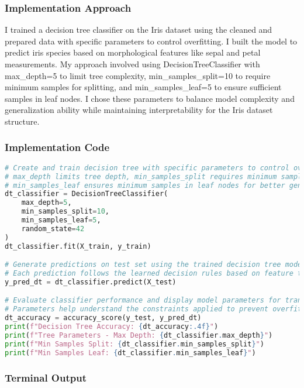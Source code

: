 \documentclass[12pt,a4paper]{article}
\begin{document}
\subsubsection{Implementation Approach}
I trained a decision tree classifier on the Iris dataset using the cleaned and prepared data with specific parameters to control overfitting. I built the model to predict iris species based on morphological features like sepal and petal measurements. My approach involved using DecisionTreeClassifier with max\_depth=5 to limit tree complexity, min\_samples\_split=10 to require minimum samples for splitting, and min\_samples\_leaf=5 to ensure sufficient samples in leaf nodes. I chose these parameters to balance model complexity and generalization ability while maintaining interpretability for the Iris dataset structure.

\subsubsection{Implementation Code}
\begin{lstlisting}[language=Python, caption=Train/Test a Decision Tree on a Labelled Dataset]
# Create and train decision tree with specific parameters to control overfitting
# max_depth limits tree depth, min_samples_split requires minimum samples to split
# min_samples_leaf ensures minimum samples in leaf nodes for better generalization
dt_classifier = DecisionTreeClassifier(
    max_depth=5,
    min_samples_split=10,
    min_samples_leaf=5,
    random_state=42
)
dt_classifier.fit(X_train, y_train)

# Generate predictions on test set using the trained decision tree model
# Each prediction follows the learned decision rules based on feature thresholds
y_pred_dt = dt_classifier.predict(X_test)

# Evaluate classifier performance and display model parameters for transparency
# Parameters help understand the constraints applied to prevent overfitting
dt_accuracy = accuracy_score(y_test, y_pred_dt)
print(f"Decision Tree Accuracy: {dt_accuracy:.4f}")
print(f"Tree Parameters - Max Depth: {dt_classifier.max_depth}")
print(f"Min Samples Split: {dt_classifier.min_samples_split}")
print(f"Min Samples Leaf: {dt_classifier.min_samples_leaf}")
\end{lstlisting}

\subsubsection{Terminal Output}
\end{document}
